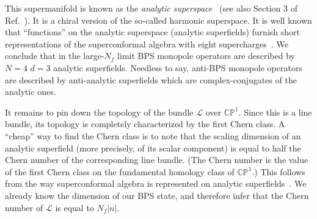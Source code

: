 \documentclass[a4paper,12pt, amsfonts, amssymb]{article}
\newcommand{\CC}{{\mathbb C}}
\newcommand{\PP}{{\mathbb P}}
\renewcommand{\L}{{\mathcal L}}
\begin{document}
This supermanifold is known as the {\it analytic superspace}~\cite{HSorig1,HSorig2,HS} (see also
Section 3 of Ref.~\cite{Z}).
It is a chiral version of the so-called harmonic superspace. 
It is well known that ``functions'' on the analytic superspace (analytic
superfields) furnish short representations of the superconformal algebra 
with eight supercharges~\cite{HS}. We conclude that in the large-$N_f$ 
limit BPS monopole operators are described by $N=4$ $d=3$ analytic superfields.
Needless to say, anti-BPS monopole operators are described by anti-analytic
superfields which are complex-conjugates of the analytic ones.

It remains to pin down the topology of the bundle $\L$
over $\CC\PP^1$. Since this is a line bundle, its topology is completely
characterized by the first Chern class. A ``cheap'' way to find the Chern
class is to note
that the scaling dimension of an analytic superfield
(more precisely, of its scalar component) is equal to half the Chern
number of the corresponding line bundle. (The Chern number is the value
of the first Chern class on the fundamental homology class of $\CC\PP^1.$) 
This follows from the way superconformal algebra is represented on analytic 
superfields~\cite{HS}. We already know the dimension of our BPS state,
and therefore infer that the Chern number of $\L$ is equal to $N_f|n|$.
\end{document}
